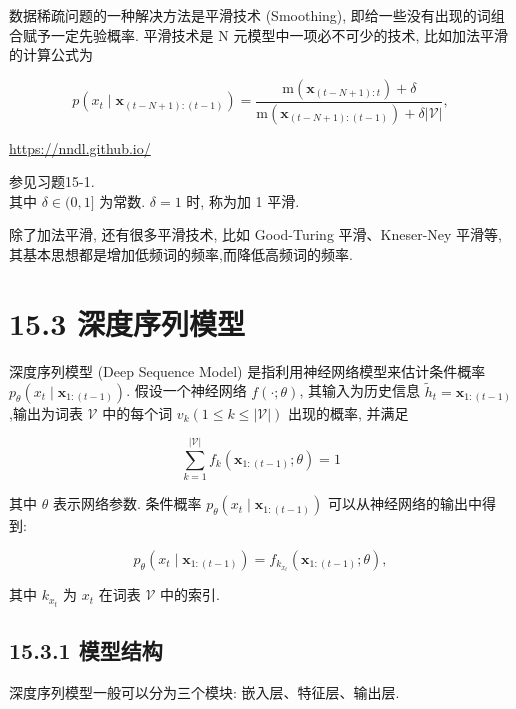 \documentclass[10pt]{article}
\begin{document}
数据稀疏问题的一种解决方法是平滑技术 (Smoothing), 即给一些没有出现的词组合赋予一定先验概率. 平滑技术是 $\mathrm{N}$ 元模型中一项必不可少的技术, 比如加法平滑的计算公式为


\begin{equation*}
p\left(x_{t} \mid \boldsymbol{x}_{(t-N+1):(t-1)}\right)=\frac{\mathrm{m}\left(\boldsymbol{x}_{(t-N+1): t}\right)+\delta}{\mathrm{m}\left(\boldsymbol{x}_{(t-N+1):(t-1)}\right)+\delta|\mathcal{V}|}, \tag{15.20}
\end{equation*}


\href{https://nndl.github.io/}{https://nndl.github.io/}

参见习题15-1.\\
其中 $\delta \in(0,1]$ 为常数. $\delta=1$ 时, 称为加 1 平滑.

除了加法平滑, 还有很多平滑技术, 比如 Good-Turing 平滑、Kneser-Ney 平滑等,其基本思想都是增加低频词的频率,而降低高频词的频率.

\section*{15.3 深度序列模型}
深度序列模型 (Deep Sequence Model) 是指利用神经网络模型来估计条件概率 $p_{\theta}\left(x_{t} \mid \boldsymbol{x}_{1:(t-1)}\right)$. 假设一个神经网络 $f(\cdot ; \theta)$, 其输入为历史信息 $\tilde{h}_{t}=\boldsymbol{x}_{1:(t-1)}$,输出为词表 $\mathcal{V}$ 中的每个词 $v_{k}(1 \leq k \leq|\mathcal{V}|)$ 出现的概率, 并满足


\begin{equation*}
\sum_{k=1}^{|\mathcal{V}|} f_{k}\left(\boldsymbol{x}_{1:(t-1)} ; \theta\right)=1 \tag{15.21}
\end{equation*}


其中 $\theta$ 表示网络参数. 条件概率 $p_{\theta}\left(x_{t} \mid \boldsymbol{x}_{1:(t-1)}\right)$ 可以从神经网络的输出中得到:


\begin{equation*}
p_{\theta}\left(x_{t} \mid \boldsymbol{x}_{1:(t-1)}\right)=f_{k_{x_{t}}}\left(\boldsymbol{x}_{1:(t-1)} ; \theta\right), \tag{15.22}
\end{equation*}


其中 $k_{x_{t}}$ 为 $x_{t}$ 在词表 $\mathcal{V}$ 中的索引.

\subsection*{15.3.1 模型结构}
深度序列模型一般可以分为三个模块: 嵌入层、特征层、输出层.
\end{document}
